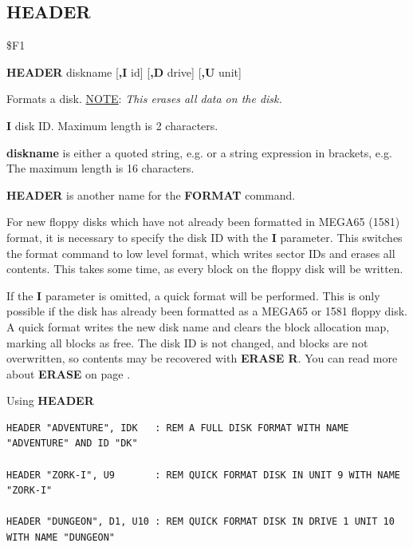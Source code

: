 \subsection{HEADER}
\begin{description}[leftmargin=2cm,style=nextline]
\item [Token:]    \$F1

\item [Format:]   {\bf HEADER} diskname [{\bf,I} id] [{\bf,D} drive] [{\bf,U} unit]

\item [Usage:]    Formats a disk. \underline{NOTE}: {\em This erases all data on the disk.}

                  {\bf I} disk ID. Maximum length is 2 characters.

                  {\bf diskname} is either a quoted string, e.g.  or a string expression in brackets, e.g.  The maximum length is 16 characters.

                  \drivedefinition

                  \unitdefinition

\item [Remarks:]  {\bf HEADER} is another name for the {\bf FORMAT} command.

                  For new floppy disks which have not already been formatted in MEGA65 (1581) format, it is necessary to specify the disk ID with the {\bf I} parameter. This switches the format command to low level format, which writes sector IDs and erases all contents. This takes some time, as every block on the floppy disk will be written.

                  If the {\bf I} parameter is omitted, a quick format will be performed. This is only possible if the disk has already been formatted as a MEGA65 or 1581 floppy disk. A quick format writes the new disk name and clears the block allocation map, marking all blocks as free. The disk ID is not changed, and blocks are not overwritten, so contents may be recovered with {\bf ERASE R}. You can read more about {\bf ERASE} on page \pageref{BASIC 65 Commands!ERASE}.

\item [Examples:] Using {\bf HEADER}

\begin{tcolorbox}[colback=black,coltext=white]
\verbatimfont{\codefont}
\begin{verbatim}
HEADER "ADVENTURE", IDK   : REM A FULL DISK FORMAT WITH NAME "ADVENTURE" AND ID "DK"

HEADER "ZORK-I", U9       : REM QUICK FORMAT DISK IN UNIT 9 WITH NAME "ZORK-I"

HEADER "DUNGEON", D1, U10 : REM QUICK FORMAT DISK IN DRIVE 1 UNIT 10 WITH NAME "DUNGEON"
\end{verbatim}
\end{tcolorbox}
\end{description}

